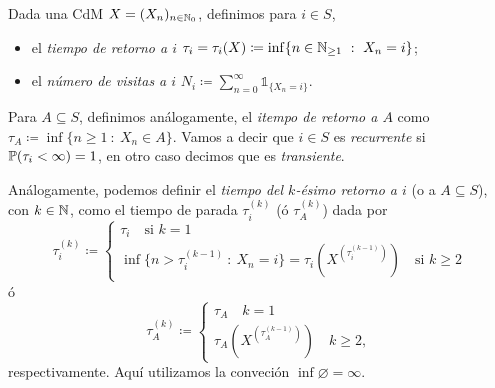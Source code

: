 
\begin{definition}
	Dada una CdM $X = (X_{n})_{n \in \mathbb{N}_{0}}$, definimos para $i \in S$,
	\begin{itemize}
		\item el \textit{tiempo de retorno a $i$} $\tau_{i} = \tau_{i}(X) \coloneq \inf \{n \in \mathbb{N}_{\geq 1} \ : \ X_{n} = i\}$;

		\item el \textit{número de visitas a $i$} $N_{i} \coloneq \sum_{n = 0}^{\infty} \mathds{1}_{\{X_{n} = i\}}$.
	\end{itemize}
	Para $A \subseteq S$, definimos análogamente, el \textit{itempo de retorno a $A$} como $\tau_{A} \coloneq \inf \{n \geq 1 \ : \ X_{n} \in A\}$. Vamos a decir que $i \in S$ es \textit{recurrente} si $\mathbb{P}(\tau_{i} < \infty) = 1$, en otro caso decimos que es \textit{transiente}. \par
	Análogamente, podemos definir el \textit{tiempo del $k$-ésimo retorno a $i$} (o a $A \subseteq S$), con $k \in \mathbb{N}$, como el tiempo de parada $\tau_{i}^{(k)}$ (ó $\tau_{A}^{(k)}$) dada por
	\[ \tau_{i}^{(k)} \coloneq \begin{cases}
		\tau_{i} \quad \text{si } k = 1 \\
		\inf \{n > \tau_{i}^{(k-1)} \ : \ X_{n} = i\} = \tau_{i}(X^{(\tau_{i}^{(k-1)})}) \quad \text{si } k \geq 2 
	\end{cases} \]
	ó
	\[ \tau_{A}^{(k)} \coloneq \begin{cases}
		\tau_{A} \quad k = 1 \\
		\tau_{A}(X^{(\tau_{A}^{(k-1)})}) \quad k \geq 2,
	\end{cases} \]
	respectivamente. Aquí utilizamos la conveción $\inf \varnothing = \infty$.
\end{definition}

